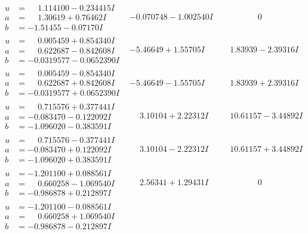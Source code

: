 \documentclass[1p]{elsarticle_modified}
\theoremstyle{definition}
\begin{document}
$$\begin{array}{c|c|c}
\begin{aligned}
u &= \phantom{-}1.114100 - 0.234415 I \\
a &= \phantom{-}1.30619 + 0.76462 I \\
b &= -1.51455 - 0.07170 I\end{aligned}
 & -0.070748 - 1.002540 I & \phantom{-0.000000 } 0 \\ \hline\begin{aligned}
u &= \phantom{-}0.005459 + 0.854340 I \\
a &= \phantom{-}0.622687 - 0.842608 I \\
b &= -0.0319577 - 0.0652390 I\end{aligned}
 & -5.46649 + 1.55705 I & \phantom{-}1.83939 - 2.39316 I \\ \hline\begin{aligned}
u &= \phantom{-}0.005459 - 0.854340 I \\
a &= \phantom{-}0.622687 + 0.842608 I \\
b &= -0.0319577 + 0.0652390 I\end{aligned}
 & -5.46649 - 1.55705 I & \phantom{-}1.83939 + 2.39316 I \\ \hline\begin{aligned}
u &= \phantom{-}0.715576 + 0.377441 I \\
a &= -0.083470 - 0.122092 I \\
b &= -1.096020 - 0.383591 I\end{aligned}
 & \phantom{-}3.10104 + 2.22312 I & \phantom{-}10.61157 - 3.44892 I \\ \hline\begin{aligned}
u &= \phantom{-}0.715576 - 0.377441 I \\
a &= -0.083470 + 0.122092 I \\
b &= -1.096020 + 0.383591 I\end{aligned}
 & \phantom{-}3.10104 - 2.22312 I & \phantom{-}10.61157 + 3.44892 I \\ \hline\begin{aligned}
u &= -1.201100 + 0.088561 I \\
a &= \phantom{-}0.660258 - 1.069540 I \\
b &= -0.986878 + 0.212897 I\end{aligned}
 & \phantom{-}2.56341 + 1.29431 I & \phantom{-0.000000 } 0 \\ \hline\begin{aligned}
u &= -1.201100 - 0.088561 I \\
a &= \phantom{-}0.660258 + 1.069540 I \\
b &= -0.986878 - 0.212897 I\end{aligned}

\end{array}$$
\end{document}
